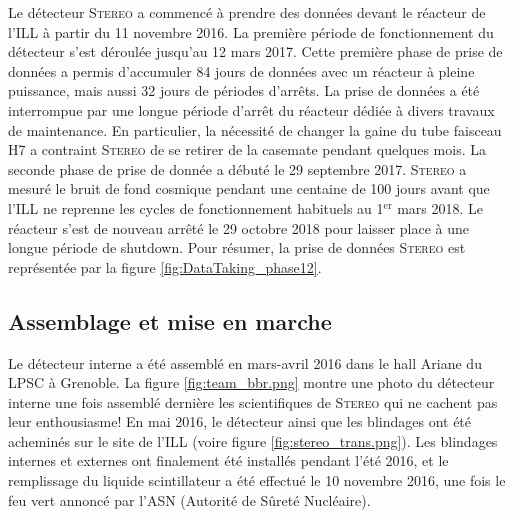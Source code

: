 Le détecteur \textsc{Stereo} a commencé à prendre des données devant le réacteur de l'ILL à partir du 11 novembre 2016. La première période de fonctionnement du détecteur s'est déroulée jusqu'au 12 mars 2017. Cette première phase de prise de données a permis d'accumuler 84 jours de données avec un réacteur à pleine puissance, mais aussi 32 jours de périodes d'arrêts. La prise de données a été interrompue par une longue période d'arrêt du réacteur dédiée à divers travaux de maintenance. En particulier, la nécessité de changer la gaine du tube faisceau H7 a contraint \textsc{Stereo} de se retirer de la casemate pendant quelques mois. La seconde phase de prise de donnée a débuté le 29 septembre 2017. \textsc{Stereo} a mesuré le bruit de fond cosmique pendant une centaine de 100 jours avant que l'ILL ne reprenne les cycles de fonctionnement habituels au 1$^\textrm{er}$ mars 2018. Le réacteur s'est de nouveau arrêté le 29 octobre 2018 pour laisser place à une longue période de shutdown. Pour résumer, la prise de données \textsc{Stereo} est représentée par la figure \ref{fig:DataTaking_phase12}.\\ 

\subsection{Assemblage et mise en marche} 
\label{sec:assemblage} 

\bigbreak 

Le détecteur interne a été assemblé en mars-avril 2016 dans le hall Ariane du LPSC à Grenoble. La figure \ref{fig:team_bbr.png} montre une photo du détecteur interne une fois assemblé dernière les scientifiques de \textsc{Stereo} qui ne cachent pas leur enthousiasme! En mai 2016, le détecteur ainsi que les blindages ont été acheminés sur le site de l'ILL (voire figure \ref{fig:stereo_trans.png}). Les blindages internes et externes ont finalement été installés pendant l'été 2016, et le remplissage du liquide scintillateur a été effectué le 10 novembre 2016, une fois le feu vert annoncé par l'ASN (Autorité de Sûreté Nucléaire).\\ 

